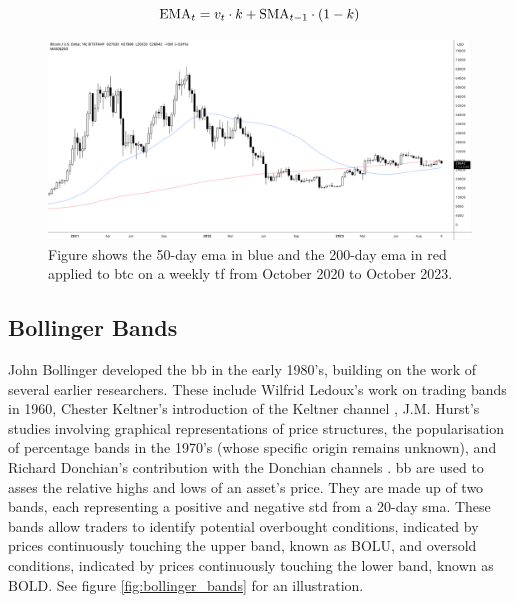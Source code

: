 \begin{equation}
    \centering
    \text{EMA}_t =  v_t \cdot k + \text{SMA}_{t-1} \cdot (1 - k) 
    \label{eq:exp_moving_average}
\end{equation}

\begin{figure}[ht]
    \centering
    \includegraphics[width=\textwidth]{./assets/img/bitcoin_moving_averages.png}
    \caption{Figure shows the 50-day \gls{ema} in blue and the 200-day \gls{ema} in red applied to \gls{btc} on a weekly \gls{tf} from October 2020 to October 2023.}
    \label{fig:bitcoin_moving_averages}
\end{figure}

\subsection{Bollinger Bands}
\label{sub:BB}
John Bollinger developed the \gls{bb} in the early 1980's, building on the work of several earlier researchers. These include Wilfrid Ledoux's work on trading bands in 1960, Chester Keltner's introduction of the Keltner channel \citep{keltner1960make}, J.M. Hurst's studies involving graphical representations of price structures, the popularisation of percentage bands in the 1970's (whose specific origin remains unknown), and Richard Donchian's contribution with the Donchian channels \citep{bollinger2023}.
\newline
\newline
\gls{bb} are used to asses the relative highs and lows of an asset's price. They are made up of two bands, each representing a positive and negative \gls{std} from a 20-day \gls{sma}. These bands allow traders to identify potential overbought conditions, indicated by prices continuously touching the upper band, known as $\text{BOLU}$, and oversold conditions, indicated by prices continuously touching the lower band, known as $\text{BOLD}$. See figure \ref{fig:bollinger_bands} for an illustration.

